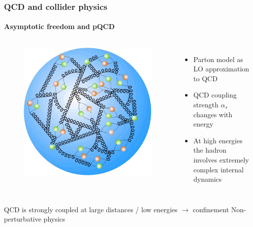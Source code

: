 \documentclass[aspectratio=43]{beamer}
\begin{document}
\begin{frame}

	\frametitle{QCD and collider physics}
	\framesubtitle{Asymptotic freedom and pQCD}

	\footnotesize
	
	\begin{columns}	
		
		
		\begin{figure}

			\includegraphics[width = 2 cm]{plots/part1/intro/proton2.jpg}
		\end{figure}
		
		
		\begin{itemize}
			\item Parton model as LO approximation to QCD
			\item QCD coupling strength $\alpha_{s}$ changes with energy
			\item At high energies the hadron involves extremely complex internal dynamics
		\end{itemize}
		
	\end{columns}
	
	\vspace{1cm}
	\center \footnotesize QCD is strongly coupled at large distances / low energies $\longrightarrow$ confinement
	\center \footnotesize \color{red} Non-perturbative physics

\end{frame}
\end{document}
